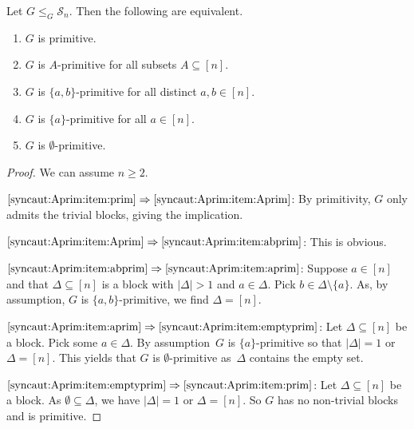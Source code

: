 \begin{proposition}
	\label{sync_max:prop:primitive_Aprimitive}
	Let $G \le_G \mathcal S_n$. Then the following are equivalent.
	\begin{enumerate}
		\item \label{syncaut:Aprim:item:prim} $G$ is primitive.
		
		\item \label{syncaut:Aprim:item:Aprim} $G$ is $A$-primitive for all subsets $A \subseteq [n]$.
		
		\item \label{syncaut:Aprim:item:abprim} $G$ is $\{a,b\}$-primitive for all distinct $a,b \in [n]$.
		
		
		\item \label{syncaut:Aprim:item:aprim} $G$ is $\{a\}$-primitive for all $a \in [n]$.
		
		\item \label{syncaut:Aprim:item:emptyprim} $G$ is $\emptyset$-primitive.
		
	\end{enumerate}	
\end{proposition}  
\begin{proof} We can assume $n \ge 2$.
	
$\ref{syncaut:Aprim:item:prim} \Rightarrow \ref{syncaut:Aprim:item:Aprim}$: By primitivity, $G$
only admits the trivial blocks, giving the implication.
	
$\ref{syncaut:Aprim:item:Aprim} \Rightarrow \ref{syncaut:Aprim:item:abprim}$: This is obvious.
	
$\ref{syncaut:Aprim:item:abprim} \Rightarrow \ref{syncaut:Aprim:item:aprim}$: 
Suppose $a \in [n]$ and that $\Delta \subseteq [n]$
is a block with $|\Delta| > 1$ and $a \in \Delta$.
Pick $b \in \Delta \setminus \{a\}$. As, by assumption, $G$ is $\{a,b\}$-primitive, we find $\Delta = [n]$.	
	
$\ref{syncaut:Aprim:item:aprim} \Rightarrow \ref{syncaut:Aprim:item:emptyprim}$: Let $\Delta \subseteq [n]$
be a block. 
Pick some $a \in \Delta$. By assumption~$G$
is $\{a\}$-primitive so that $|\Delta| = 1$
or $\Delta = [n]$.
This yields that $G$ is $\emptyset$-primitive as~$\Delta$ contains the empty set.
	
$\ref{syncaut:Aprim:item:emptyprim} \Rightarrow \ref{syncaut:Aprim:item:prim}$: 
Let $\Delta \subseteq [n]$ be a block.
As $\emptyset \subseteq \Delta$, we have $|\Delta| = 1$ or $\Delta = [n]$.
So $G$ has no non-trivial blocks and is primitive.	
\end{proof}

